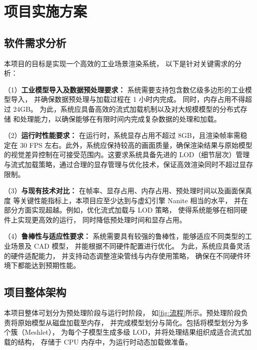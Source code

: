 \cleardoublepage

\section{项目实施方案}

\subsection{软件需求分析}

本项目的目标是实现一个高效的工业场景渲染系统，
以下是针对关键需求的分析：

\par （1）\textbf{工业模型导入及数据预处理要求：}  
系统需要支持包含数亿级多边形的工业模型导入，
并确保数据预处理与加载过程在 1 小时内完成。
同时，内存占用不得超过 24GB。
为此，系统应具备高效的流式加载机制以及对大规模模型的分布式存储
和处理能力，以确保能够在有限时间内完成复杂数据的处理和加载。

\par （2）\textbf{运行时性能要求：}  
在运行时，系统显存占用不超过 8GB，且渲染帧率需稳定在 30 FPS 左右。此外，系统应保持较高的画面质量，确保渲染结果与原始模型的视觉差异控制在可接受范围内。这要求系统具备先进的 LOD（细节层次）管理与流式加载策略，通过合理的显存管理与优化技术，保证高效渲染同时不超过显存限制。

\par （3）\textbf{与现有技术对比：}  
在帧率、显存占用、内存占用、预处理时间以及画面保真度
等关键性能指标上，本项目应至少达到与虚幻引擎 Nanite 相当的水平，
并在部分方面实现超越。例如，优化流式加载与 LOD 策略，
使得系统能够在相同硬件上实现更高效的运行，
同时降低预处理时间和显存占用。

\par （4）\textbf{鲁棒性与适应性要求：}  
系统需要具有较强的鲁棒性，能够适应不同类型的工业场景及 CAD 模型，
并能根据不同硬件配置进行优化。
为此，系统应具备灵活的硬件适配能力，
并支持动态调整渲染管线与内存使用策略，
确保在不同硬件环境下都能达到预期性能。

\subsection{项目整体架构}

\par 本项目整体可划分为预处理阶段与运行时阶段，  
如\autoref{fig:流程}所示。预处理阶段负责将原始模型从磁盘加载至内存，  
并完成模型划分与简化。包括将模型划分为多个簇（Meshlet），  
为每个子模型生成多级 LOD，并将处理结果组织成适合流式加载的结构，  
存储于 CPU 内存中，为运行时动态加载做准备。


